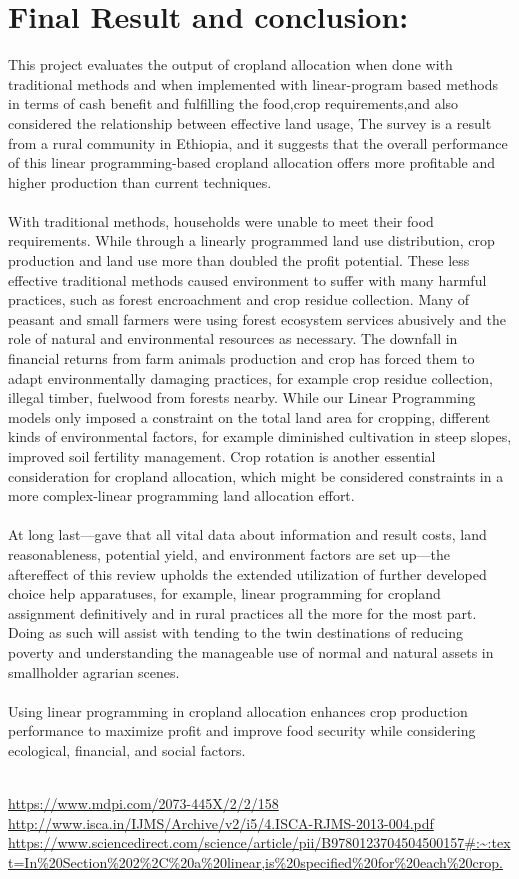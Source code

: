 \documentclass[conference]{IEEEtran}
\begin{document}
\section{Final Result and conclusion:}
This project evaluates the output of cropland allocation when done with traditional methods and when implemented with linear-program based methods in terms of cash benefit and fulfilling the food,crop requirements,and also considered the relationship between effective land usage, The survey is a result from a rural community in  Ethiopia, and it suggests that the overall performance of this linear programming-based cropland allocation offers more profitable and higher production than current techniques.
\\\\
With traditional methods, households were unable to meet their food requirements. While through a linearly programmed land use distribution, crop production and land use more than doubled the profit potential. These less effective traditional methods caused environment to suffer with many harmful practices, such as forest encroachment and crop residue collection. Many of peasant and small farmers were using forest ecosystem services abusively and the role of natural and environmental resources as necessary. The downfall in financial returns from farm animals production and crop has forced them to adapt environmentally damaging practices, for example crop residue collection, illegal timber, fuelwood from forests nearby. While our Linear Programming models only imposed a constraint on the total land area for cropping, different kinds of  environmental factors, for example diminished cultivation in steep slopes, improved soil fertility management. Crop rotation is another essential consideration for cropland allocation, which might be considered constraints in a more complex-linear programming land allocation effort.
\\\\
At long last—gave that all vital data about information and result costs, land reasonableness, potential yield, and environment factors are set up—the aftereffect of this review upholds the extended utilization of further developed choice help apparatuses, for example, linear programming for cropland assignment definitively and in rural practices all the more for the most part. Doing as such will assist with tending to the twin destinations of reducing poverty and understanding the manageable use of normal and natural assets in smallholder agrarian scenes.
\\\\
Using linear programming in cropland allocation enhances crop production performance to maximize profit and improve food security while considering ecological, financial, and social factors.
\\\\
\begin{thebibliography}{00}
 \url{https://www.mdpi.com/2073-445X/2/2/158}
 \url{http://www.isca.in/IJMS/Archive/v2/i5/4.ISCA-RJMS-2013-004.pdf} 
 \url{https://www.sciencedirect.com/science/article/pii/B9780123704504500157#:~:text=In%20Section%202%2C%20a%20linear,is%20specified%20for%20each%20crop.}
\end{thebibliography}
\end{document}
